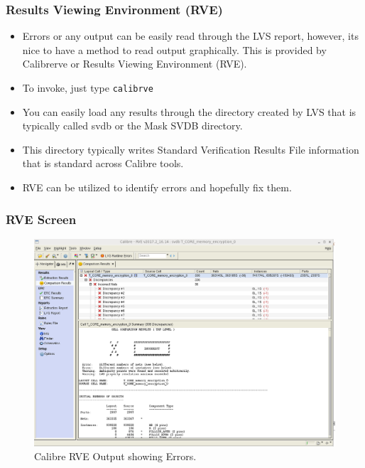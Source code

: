 \documentclass{beamer}
\begin{document}
\begin{frame}[fragile]
\frametitle{Results Viewing Environment (RVE)}
\begin{itemize}
\item Errors or any output can be easily read through the LVS report,
  however, its nice to have a method to read output graphically.  This
  is provided by Calibrerve or Results Viewing Environment (RVE).
\item To invoke, just type \verb+calibrve+
\item You can easily load any results through the directory created by
  LVS that is typically called svdb or the Mask SVDB directory.
\item This directory typically writes Standard Verification Results
  File information that is standard across Calibre tools.
\item RVE can be utilized to identify errors and hopefully fix them.
\end{itemize}
\end{frame}
\begin{frame}
\frametitle{RVE Screen}
\begin{center}
\begin{figure}
	\vspace{-0.1in}
\includegraphics[scale=0.23]{Fig/lvs2-2.png} 
\vspace{-0.1in}
\caption{Calibre RVE Output showing Errors.}
\end{figure}
\end{center}
\end{frame}
\end{document}
